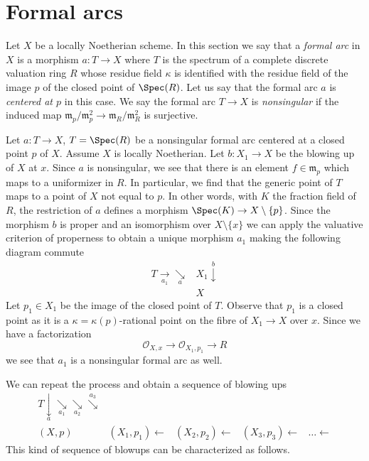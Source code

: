 \section{Formal arcs}
\label{resolve-section-arcs}
Let $X$ be a locally Noetherian scheme. In this section we say that a
{\it formal arc} in $X$ is a morphism $a : T \to X$ where $T$ is the
spectrum of a complete discrete valuation ring $R$ whose residue field
$\kappa$ is identified with the residue field of the image $p$ of the
closed point of $\Spec(R)$. Let us say that the formal arc $a$ is
{\it centered at $p$} in this case. We say the formal arc $T \to X$
is {\it nonsingular} if the induced map
$\mathfrak m_p/\mathfrak m_p^2 \to \mathfrak m_R/\mathfrak m_R^2$
is surjective.

\medskip\noindent
Let $a : T \to X$, $T = \Spec(R)$ be a nonsingular formal arc centered
at a closed point $p$ of $X$. Assume $X$ is locally Noetherian.
Let $b : X_1 \to X$ be the blowing up of $X$ at $x$.
Since $a$ is nonsingular, we see that there is an element
$f \in \mathfrak m_p$ which maps to a uniformizer in $R$.
In particular, we find that the generic point of $T$ maps to
a point of $X$ not equal to $p$. In other words, with $K$
the fraction field of $R$, the restriction of $a$ defines a morphism
$\Spec(K) \to X \setminus \{p\}$. Since the morphism $b$ is
proper and an isomorphism over $X \setminus \{x\}$ we can apply
the valuative criterion of properness to obtain a unique morphism
$a_1$ making the following diagram commute
$$
\begin{array}{cc}T \underset{a_1}{\longrightarrow}\underset{a}{\searrow} & X_1 \overset{b}{\downarrow} \\  & X\end{array}
$$
Let $p_1 \in X_1$ be the image of the closed point of $T$. Observe that
$p_1$ is a closed point as it is a $\kappa = \kappa(p)$-rational point
on the fibre of $X_1 \to X$ over $x$. Since we have a factorization
$$
\mathcal{O}_{X, x} \to \mathcal{O}_{X_1, p_1} \to R
$$
we see that $a_1$ is a nonsingular formal arc as well.

\medskip\noindent
We can repeat the process and obtain a sequence of blowing ups
$$
\begin{array}{ccccc}T \underset{a}{\downarrow}\underset{a_1}{\searrow}\underset{a_2}{\searrow}\overset{a_3}{\searrow} &  &  &  &  \\ (X, p) & (X_1, p_1) \longleftarrow & (X_2, p_2) \longleftarrow & (X_3, p_3) \longleftarrow & \ldots \longleftarrow\end{array}
$$
This kind of sequence of blowups can be characterized as follows.


